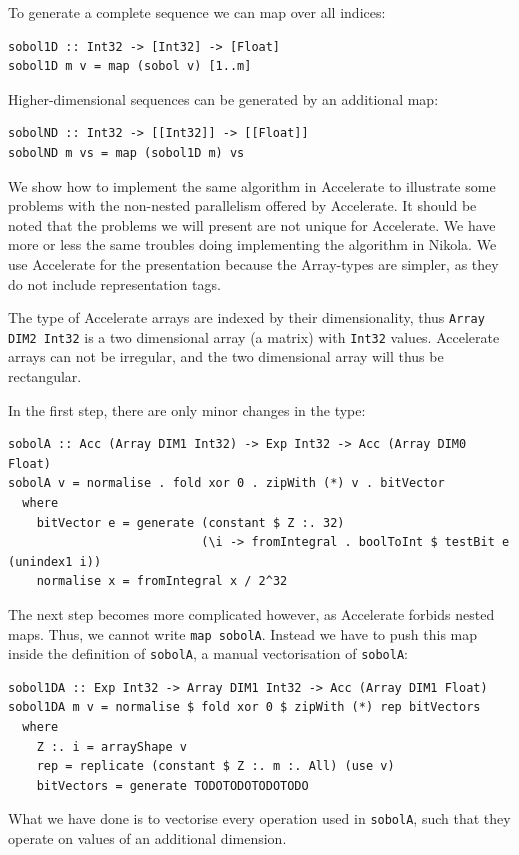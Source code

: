 \documentclass[preprint]{sigplanconf}
\begin{document}
To generate a complete sequence we can map over all indices:
\begin{verbatim}
sobol1D :: Int32 -> [Int32] -> [Float]
sobol1D m v = map (sobol v) [1..m]
\end{verbatim}
Higher-dimensional sequences can be generated by an additional map:
\begin{verbatim}
sobolND :: Int32 -> [[Int32]] -> [[Float]]
sobolND m vs = map (sobol1D m) vs
\end{verbatim}

We show how to implement the same algorithm in Accelerate to
illustrate some problems with the non-nested parallelism offered by
Accelerate. It should be noted that the problems we will present are
not unique for Accelerate. We have more or less the same troubles
doing implementing the algorithm in Nikola. We use Accelerate for the
presentation because the Array-types are simpler, as they do not
include representation tags.

The type of Accelerate arrays are indexed by their dimensionality,
thus \verb|Array DIM2 Int32| is a two dimensional array (a matrix) with
\verb|Int32| values. Accelerate arrays can not be irregular, and the
two dimensional array will thus be rectangular.

In the first step, there are only minor changes in the type:
\begin{verbatim}
sobolA :: Acc (Array DIM1 Int32) -> Exp Int32 -> Acc (Array DIM0 Float)
sobolA v = normalise . fold xor 0 . zipWith (*) v . bitVector
  where
    bitVector e = generate (constant $ Z :. 32)
                           (\i -> fromIntegral . boolToInt $ testBit e (unindex1 i))
    normalise x = fromIntegral x / 2^32
\end{verbatim}

The next step becomes more complicated however, as Accelerate forbids
nested maps. Thus, we cannot write \verb|map sobolA|.
Instead we have to push this map inside the definition of
\verb|sobolA|, a manual vectorisation of \verb|sobolA|:
\begin{verbatim}
sobol1DA :: Exp Int32 -> Array DIM1 Int32 -> Acc (Array DIM1 Float)
sobol1DA m v = normalise $ fold xor 0 $ zipWith (*) rep bitVectors
  where
    Z :. i = arrayShape v
    rep = replicate (constant $ Z :. m :. All) (use v)
    bitVectors = generate TODOTODOTODOTODO
\end{verbatim}
What we have done is to vectorise every operation used in
\verb|sobolA|, such that they operate on values of an additional
dimension.
\end{document}
